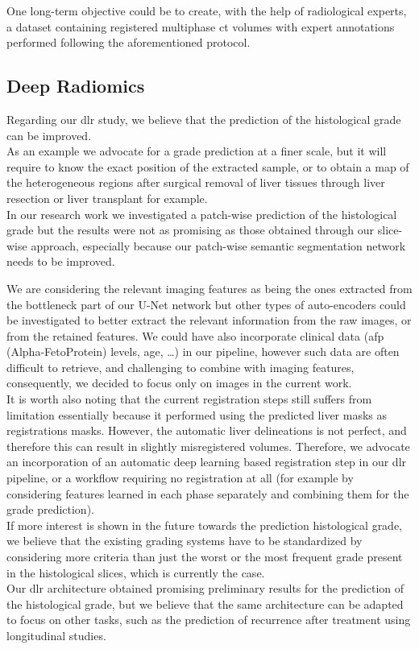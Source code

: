One long-term objective could be to create, with the help of
radiological experts, a dataset containing registered multiphase \ac{ct}
volumes with expert annotations performed following the aforementioned
protocol.

\subsection{Deep Radiomics}

Regarding our \ac{dlr} study, we believe that the prediction of the
histological grade can be improved. \\
As an example we advocate for a grade prediction at a finer
scale, but it will require to know the exact position of the extracted
sample, or to obtain a map of the heterogeneous regions after surgical
removal of liver tissues through liver resection or liver transplant for
example.\\
In our research work we investigated a patch-wise prediction of the
histological grade but the results were not as promising as those
obtained through our slice-wise approach, especially because our
patch-wise semantic segmentation network needs to be improved.

We are considering the relevant imaging features as being the
ones extracted from the bottleneck part of our U-Net network but other
types of auto-encoders could be investigated to better
extract the relevant information from the raw images, or from the
retained features. We could have also incorporate clinical
data (\ac{afp} (Alpha-FetoProtein) levels, age, \ldots{}) in our pipeline, however such data are
often difficult to retrieve, and challenging to combine with imaging
features, consequently, we decided to focus only on images in the
current work.\\
It is worth also noting that the current registration steps still suffers from limitation
essentially because it performed using the predicted liver masks as registrations masks. However, the automatic liver delineations is not perfect, and therefore this can result in slightly misregistered volumes. Therefore, we advocate an incorporation of an automatic deep learning based registration step in our \ac{dlr} pipeline, or a workflow requiring no registration at all (for example by considering features learned in each phase separately and combining them for the grade prediction).\\
If more interest is shown in the future towards the prediction
histological grade, we believe that the existing grading systems have to
be standardized by considering more criteria than just the worst or the
most frequent grade present in the histological slices, which is
currently the case.\\
Our \ac{dlr} architecture obtained promising preliminary results for the prediction of
the histological grade, but we believe that the same architecture can be
adapted to focus on other tasks, such as the prediction of
recurrence after treatment using longitudinal studies.
